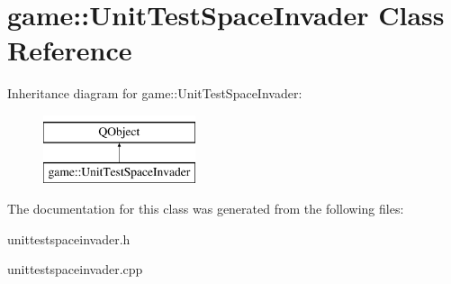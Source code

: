 \hypertarget{classgame_1_1UnitTestSpaceInvader}{}\section{game\+:\+:Unit\+Test\+Space\+Invader Class Reference}
\label{classgame_1_1UnitTestSpaceInvader}
Inheritance diagram for game\+:\+:Unit\+Test\+Space\+Invader\+:\begin{figure}[H]
\begin{center}
\leavevmode
\includegraphics[height=2.000000cm]{classgame_1_1UnitTestSpaceInvader}
\end{center}
\end{figure}


The documentation for this class was generated from the following files\+:\begin{DoxyCompactItemize}
\item 
unittestspaceinvader.\+h\item 
unittestspaceinvader.\+cpp\end{DoxyCompactItemize}
